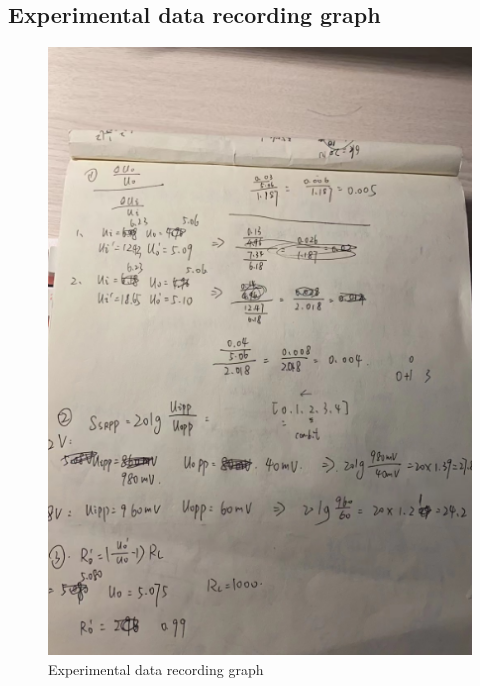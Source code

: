 \documentclass[UTF8]{article}
\begin{document}
\begin{appendix}
 \section{Experimental data recording graph} 
     	\begin{figure}[H]
     	    	\centering
     	    	\includegraphics[clip,scale=1.6,trim={0 0 0 0}]{fig/fig19.png}
     	        \caption{Experimental data recording graph}
     	        \label{figure.19}
         \end{figure} 
 \end{appendix}        
\end{document}
